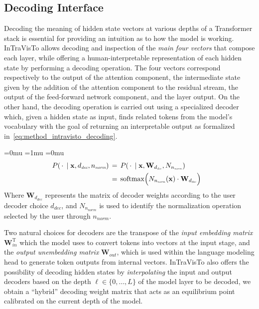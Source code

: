 \documentclass[11pt,a4paper,twocolumn]{article}
\newcommand{\gbm}[1]{\bm{\mathbf{#1}}} %
\renewcommand{\T}{\mathrm{T}} %
\begin{document}
\subsection{Decoding Interface}\label{ssec:intravisto_1}

Decoding the meaning of hidden state vectors at various depths of a Transformer stack is essential for providing an intuition as to how the model is working.
InTraVisTo allows decoding and inspection of the \emph{main four vectors} that compose each layer, while offering a human-interpretable representation of each hidden state by performing a decoding operation.
The four vectors correspond respectively to the output of the attention component, the intermediate state given by the addition of the attention component to the residual stream, the output of the feed-forward network component, and the layer output.
On the other hand, the decoding operation is carried out using a specialized decoder which, given a hidden state as input, finds related tokens from the model's vocabulary with the goal of returning an interpretable output as formalized in~\cref{eq:method_intravisto_decoding}.

\vspace{-12pt}
{
\medmuskip=0mu
\thinmuskip=1mu
\thickmuskip=0mu
\scriptspace=0pt
\begin{equation}
\label{eq:method_intravisto_decoding}
\hspace{-10pt}
\begin{aligned}
P(\,\cdot\,\mid \gbm{x}, d_\textit{\scalebox{.8}{dec}}, n_\textit{\scalebox{.8}{norm}}) \,&=\, P(\,\cdot\,\mid \gbm{x}, \gbm{W}_{d_\textit{\scalebox{.8}{dec}}}, N_{n_\textit{\scalebox{.8}{norm}}}) \\
&=\,\operatorname{softmax}\Bigl(N_{n_\textit{\scalebox{.8}{norm}}}(\gbm{x}) \cdot \gbm{W}_{d_\textit{\scalebox{.8}{dec}}}\Bigr)
\end{aligned}
\end{equation}
}
Where $\gbm{W}_{d_\textit{dec}}$ represents the matrix of decoder weights according to the user decoder choice $d_\textit{dec}$, and $N_{n_\textit{norm}}$ is used to identify the normalization operation selected by the user through $n_\textit{norm}$.

Two natural choices for decoders are the transpose of the \emph{input embedding matrix} $\gbm{W}_\textit{in}^\T$ which the model uses to convert tokens into vectors at the input stage, and the \emph{output unembedding matrix} $\gbm{W}_\textit{out}$, which is used within the language modeling head to generate token outputs from internal vectors.
InTraVisTo also offers the possibility of decoding hidden states by \emph{interpolating} the input and output decoders based on the depth $\ell\in\{0,\ldots,L\}$ of the model layer to be decoded, we obtain a ``hybrid'' decoding weight matrix that acts as an equilibrium point calibrated on the current depth of the model.
\end{document}
